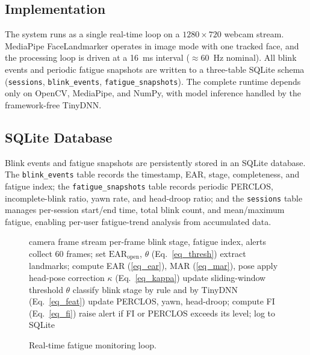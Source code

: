 \documentclass{IEEE_lsens}
\begin{document}
\subsection{Implementation}
The system runs as a single real-time loop on a $1280\times720$ webcam stream.
MediaPipe FaceLandmarker operates in image mode with one tracked face, and the
processing loop is driven at a 16~ms interval ($\approx$60~Hz nominal). All
blink events and periodic fatigue snapshots are written to a three-table
SQLite schema (\texttt{sessions}, \texttt{blink\_events},
\texttt{fatigue\_snapshots}). The complete runtime depends only on
OpenCV, MediaPipe, and NumPy, with model inference handled by the
framework-free TinyDNN.

\subsection{SQLite Database}
Blink events and fatigue snapshots are persistently stored in an SQLite
database. The \texttt{blink\_events} table records the timestamp, EAR, stage,
completeness, and fatigue index; the \texttt{fatigue\_snapshots} table records
periodic PERCLOS, incomplete-blink ratio, yawn rate, and head-droop ratio; and
the \texttt{sessions} table manages per-session start/end time, total blink
count, and mean/maximum fatigue, enabling per-user fatigue-trend analysis from
accumulated data.

\begin{figure}[!t]
\begin{algorithmic}[1]
\renewcommand{\algorithmicrequire}{\textbf{Input:}}
\renewcommand{\algorithmicensure}{\textbf{Output:}}
\REQUIRE camera frame stream
\ENSURE per-frame blink stage, fatigue index, alerts
\STATE collect 60 frames; set $\mathrm{EAR}_{\text{open}}$, $\theta$ (Eq.~\ref{eq_thresh})
  \STATE extract landmarks; compute EAR (\ref{eq_ear}), MAR (\ref{eq_mar}), pose
  \STATE apply head-pose correction $\kappa$ (Eq.~\ref{eq_kappa})
  \STATE update sliding-window threshold $\theta$
  \STATE classify blink stage by rule and by TinyDNN (Eq.~\ref{eq_feat})
  \STATE update PERCLOS, yawn, head-droop; compute FI (Eq.~\ref{eq_fi})
  \STATE raise alert if FI or PERCLOS exceeds its level; log to SQLite
\ENDFOR
\end{algorithmic}
\caption{Real-time fatigue monitoring loop.}
\label{alg_pipeline}
\end{figure}
\end{document}
